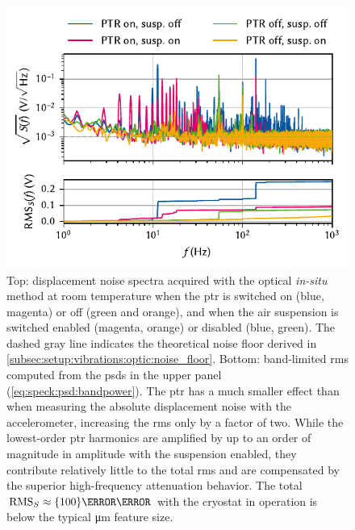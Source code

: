\begin{figure}
    \centering
    \includegraphics{img/pdf/setup/spect_optic}
    \caption[]{
        Top: displacement noise spectra acquired with the optical \emph{in-situ} method at room temperature when the \gls{ptr} is switched on (blue, magenta) or off (green and orange), and when the air suspension is switched enabled (magenta, orange) or disabled (blue, green).
        The dashed gray line indicates the theoretical noise floor derived in \cref{subsec:setup:vibrations:optic:noise_floor}.
        Bottom: band-limited \gls{rms} computed from the \glspl{psd} in the upper panel (\cf \cref{eq:speck:psd:bandpower}).
        The \gls{ptr} has a much smaller effect than when measuring the absolute displacement noise with the accelerometer, increasing the \gls{rms} only by a factor of two.
        While the lowest-order \gls{ptr} harmonics are amplified by up to an order of magnitude in amplitude with the suspension enabled, they contribute relatively little to the total \gls{rms} and are compensated by the superior high-frequency attenuation behavior.
        The total $\rms_S \approx \qty{100}{\nano\meter}$ with the cryostat in operation is below the typical \unit{\micro\meter} feature size.
    }
    \label{fig:setup:vibrations:optic}
\end{figure}

